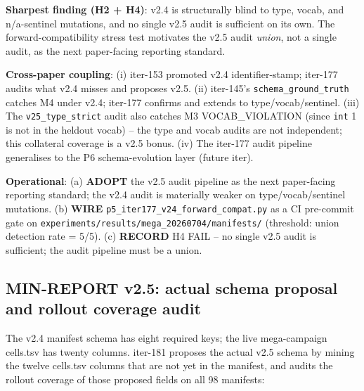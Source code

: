 \documentclass{article}  \usepackage[preprint,nonatbib]{neurips_2026} \usepackage[numbers]{natbib}
\begin{document}
\noindent\textbf{Sharpest finding (H2 + H4)}: v2.4 is structurally
blind to type, vocab, and n/a-sentinel mutations, and no single v2.5
audit is sufficient on its own. The forward-compatibility stress
test motivates the v2.5 audit \emph{union}, not a single audit,
as the next paper-facing reporting standard.

\noindent\textbf{Cross-paper coupling}: (i) iter-153 promoted v2.4
identifier-stamp; iter-177 audits what v2.4 misses and proposes
v2.5. (ii) iter-145's \texttt{schema\_ground\_truth} catches M4
under v2.4; iter-177 confirms and extends to type/vocab/sentinel.
(iii) The \texttt{v25\_type\_strict} audit also catches
M3 VOCAB\_VIOLATION (since \texttt{int} 1 is not in the heldout
vocab) -- the type and vocab audits are not independent; this
collateral coverage is a v2.5 bonus. (iv) The iter-177 audit
pipeline generalises to the P6 schema-evolution layer (future iter).

\noindent\textbf{Operational}: (a) \textbf{ADOPT} the v2.5 audit
pipeline as the next paper-facing reporting standard; the v2.4
audit is materially weaker on type/vocab/sentinel mutations.
(b) \textbf{WIRE} \texttt{p5\_iter177\_v24\_forward\_compat.py}
as a CI pre-commit gate on
\texttt{experiments/results/mega\_20260704/manifests/}
(threshold: union detection rate = 5/5).
(c) \textbf{RECORD} H4 FAIL -- no single v2.5 audit is sufficient;
the audit pipeline must be a union. \subsection{MIN-REPORT v2.5: actual schema proposal and rollout coverage audit}
\label{sec:p5-iter181-v25-rollout}

The v2.4 manifest schema has eight required keys; the live mega-campaign
cells.tsv has twenty columns. iter-181 proposes the actual v2.5 schema by
mining the twelve cells.tsv columns that are not yet in the manifest, and
audits the rollout coverage of those proposed fields on all 98 manifests:
\end{document}
